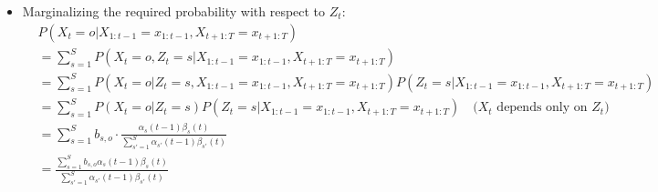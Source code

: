 \documentclass{article}
\begin{document}
\begin{itemize}
    \item[\textbf{1.2}] Marginalizing the required probability with respect to $Z_t$:
    \begin{align*}
      &P(X_t = o | X_{1:t-1} = x_{1:t-1}, X_{t+1:T} = x_{t+1:T}) \\
      &= \sum_{s=1}^{S} P(X_t = o, Z_t = s | X_{1:t-1} = x_{1:t-1}, X_{t+1:T} = x_{t+1:T}) \\
      &= \sum_{s=1}^{S} P(X_t = o | Z_t = s, X_{1:t-1} = x_{1:t-1}, X_{t+1:T} = x_{t+1:T}) P(Z_t = s | X_{1:t-1} = x_{1:t-1}, X_{t+1:T} = x_{t+1:T}) \\
      &= \sum_{s=1}^{S} P(X_t = o | Z_t = s) P(Z_t = s | X_{1:t-1} = x_{1:t-1}, X_{t+1:T} = x_{t+1:T}) \quad \text{($X_t$ depends only on $Z_t$)} \\
      &= \sum_{s=1}^{S} b_{s,o} \cdot \frac{\alpha_s(t-1) \beta_s(t)}{\sum_{s'=1}^{S} \alpha_{s'}(t-1) \beta_{s'}(t)} \\
      &= \frac{\sum_{s=1}^{S} b_{s,o} \alpha_s(t-1) \beta_s(t)}{\sum_{s'=1}^{S} \alpha_{s'}(t-1) \beta_{s'}(t)}
    \end{align*}
  \end{itemize}
\end{document}
